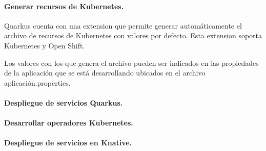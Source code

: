\paragraph{Generar recursos de Kubernetes.}

Quarkus cuenta con una extension que permite generar automáticamente el archivo de recursos de Kubernetes con valores por defecto. Esta extension soporta Kubernetes y Open Shift.
\par
Los valores con los que genera el archivo pueden ser indicados en las propiedades de la aplicación que se está desarrollando ubicados en el archivo aplicación.properties.

\paragraph{Despliegue de servicios Quarkus.}


\paragraph{Desarrollar operadores Kubernetes.}


\paragraph{Despliegue de servicios en Knative.}



